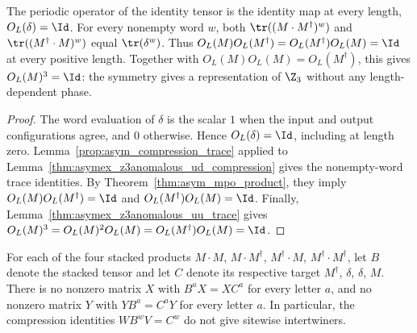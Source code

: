 \begin{lemma}
    \label{thm:asymex_z3anomalous_group_law}
    \leanok
    The periodic operator of the identity tensor is the identity map at every length,
    $O_L(\delta)=\Id$. For every nonempty word $w$, both
    $\tr((M\cdot M^\dagger)^w)$ and $\tr((M^\dagger\cdot M)^w)$ equal $\tr(\delta^w)$.
    Thus $O_L(M)O_L(M^\dagger)=O_L(M^\dagger)O_L(M)=\Id$ at every positive length.
    Together with $O_L(M)O_L(M)=O_L(M^\dagger)$, this gives $O_L(M)^3=\Id$:
    the symmetry gives a representation of $\Z_3$ without any length-dependent phase.
\end{lemma}

\begin{proof}
    \leanok
    The word evaluation of $\delta$ is the scalar $1$ when the input and
    output configurations agree, and $0$ otherwise. Hence $O_L(\delta)=\Id$,
    including at length zero. Lemma~\ref{prop:asym_compression_trace}
    applied to Lemma~\ref{thm:asymex_z3anomalous_ud_compression} gives the
    nonempty-word trace identities. By Theorem~\ref{thm:asym_mpo_product},
    they imply $O_L(M)O_L(M^\dagger)=\Id$ and
    $O_L(M^\dagger)O_L(M)=\Id$. Finally,
    Lemma~\ref{thm:asymex_z3anomalous_uu_trace} gives
    $O_L(M)^3=O_L(M)^2O_L(M)=O_L(M^\dagger)O_L(M)=\Id$.
\end{proof}

\begin{lemma}
    \label{thm:asymex_z3anomalous_no_intertwiner}
    \leanok
    For each of the four stacked products $M\cdot M$, $M\cdot M^\dagger$,
    $M^\dagger\cdot M$, $M^\dagger\cdot M^\dagger$, let $B$ denote the stacked tensor
    and let $C$ denote its respective target $M^\dagger$, $\delta$, $\delta$, $M$.
    There is no nonzero matrix $X$ with $B^aX=XC^a$ for every letter $a$,
    and no nonzero matrix $Y$ with $YB^a=C^aY$ for every letter $a$.
    In particular, the compression identities $WB^wV=C^w$ do not give
    sitewise intertwiners.
\end{lemma}

